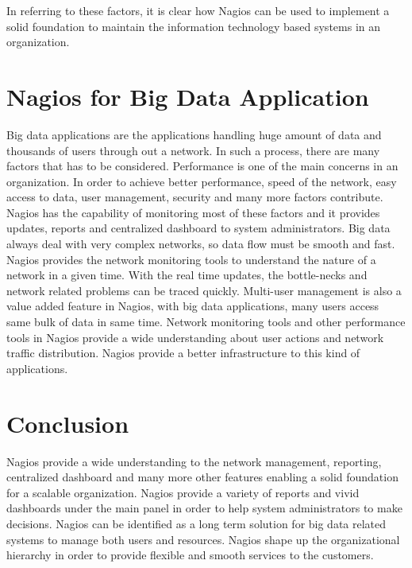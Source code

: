 \documentclass[9pt,twocolumn,twoside]{styles/osajnl}
\begin{document}
In referring to these factors, it is clear how Nagios can be used to
implement a solid foundation to maintain the information technology
based systems in an organization.

\section{Nagios for Big Data Application}

Big data applications are the applications handling huge amount of
data and thousands of users through out a network. In such a process,
there are many factors that has to be considered. Performance is
one of the main concerns in an organization. In order to achieve better
performance, speed of the network, easy access to data, user management,
security and many more factors contribute. Nagios has the capability of
monitoring most of these factors and it provides updates, reports and
centralized dashboard to system administrators. Big data always
deal with very complex networks, so data flow must be smooth and fast.
Nagios provides the network monitoring tools to understand the nature
of a network in a given time. With the real time updates, the bottle-necks
and network related problems can be traced quickly. Multi-user management
is also a value added feature in Nagios, with big data applications, many
users access same bulk of data in same time. Network monitoring tools and
other performance tools in Nagios provide a wide understanding about user
actions and network traffic distribution. Nagios provide a better infrastructure
to this kind of applications. 

\section{Conclusion}

Nagios provide a wide understanding to the network management, reporting,
centralized dashboard and many more other features enabling a solid
foundation for a scalable organization. Nagios provide a variety of
reports and vivid dashboards under the main panel in order to help
system administrators to make decisions. Nagios can be identified as a long
term solution for big data related systems to manage both users and resources.
Nagios shape up the organizational hierarchy in order to provide flexible
and smooth services to the customers.



 
\end{document}
